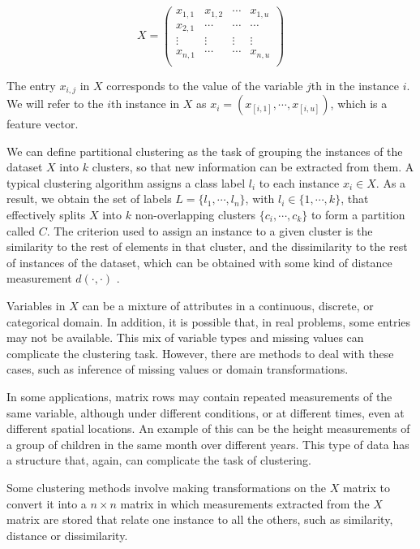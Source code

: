 $$ X = \left( \begin{array}{cccc}

x_{1,1} & x_{1,2} & \cdots & x_{1,u} \\

x_{2,1} & \cdots & \cdots & \cdots  \\

\vdots & \vdots & \vdots & \vdots \\

x_{n,1} & \cdots & \cdots & x_{n,u} \\

\end{array} \right) $$

The entry $x_{i,j}$ in $X$ corresponds to the value of the variable $j$th in the instance $i$. We will refer to the $i$th instance in $X$ as $x_i = (x_{[i,1]}, \cdots, x_{[i,u]})$, which is a feature vector.

We can define partitional clustering as the task of grouping the instances of the dataset $X$ into $k$ clusters, so that new information can be extracted from them. A typical clustering algorithm assigns a class label $l_i$ to each instance $x_i \in X$. As a result, we obtain the set of labels $L = \{l_1, \cdots, l_n\}$, with $l_i \in \{1, \cdots, k\}$, that effectively splits $X$ into $k$ non-overlapping clusters $\{c_i, \cdots, c_k\}$ to form a partition called $C$. The criterion used to assign an instance to a given cluster is the similarity to the rest of elements in that cluster, and the dissimilarity to the rest of instances of the dataset, which can be obtained with some kind of distance measurement $d(\cdot,\cdot)$ \cite{jain1999data}.

Variables in $X$ can be a mixture of attributes in a continuous, discrete, or categorical domain. In addition, it is possible that, in real problems, some entries may not be available. This mix of variable types and missing values can complicate the clustering task. However, there are methods to deal with these cases, such as inference of missing values or domain transformations.

In some applications, matrix rows may contain repeated measurements of the same variable, although under different conditions, or at different times, even at different spatial locations. An example of this can be the height measurements of a group of children in the same month over different years. This type of data has a structure that, again, can complicate the task of clustering.

Some clustering methods involve making transformations on the $X$ matrix to convert it into a $n \times n$ matrix in which measurements extracted from the $X$ matrix are stored that relate one instance to all the others, such as similarity, distance or dissimilarity.

